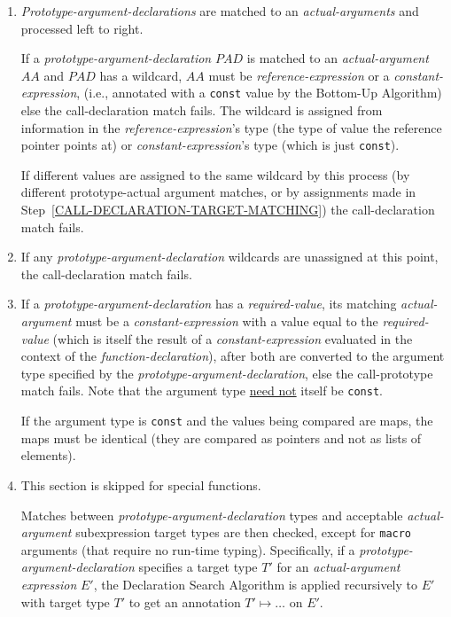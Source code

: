 \documentclass[12pt]{article}
\begin{document}
\begin{enumerate}
\item\label{CALL-DECLARATION-ARGUMENT-MATCHING}
{\em Prototype-argument-declarations} are matched to
an {\em actual-arguments} and processed left to right.

If a {\em prototype-argument-declaration} $PAD$ is matched
to an {\em actual-argument} $AA$ and $PAD$ has a wildcard,
$AA$ must be {\em reference-expression} or a {\em constant-expression},
(i.e., annotated with a {\tt const} value by the Bottom-Up Algorithm)
else the
call-declaration match fails.  The wildcard is assigned from
information in the {\em reference-expression}'s
type (the type of value the reference pointer points at) or
{\em constant-expression}'s type (which is just {\tt const}).

If different values are assigned to the same wildcard by this
process (by different prototype-actual argument matches, or by
assignments made in Step~\ref{CALL-DECLARATION-TARGET-MATCHING})
the call-declaration match fails.

\item\label{CALL-DECLARATION-UNASSIGNED-WILDCARDS}
If any {\em prototype-argument-declaration} wildcards are unassigned
at this point,
the call-declaration match fails.

\item\label{CALL-DECLARATION-REQUIRED-VALUES}
If a {\em prototype-argument-declaration} has a {\em required-value},
its matching {\em actual-argument} must be a {\em constant-expression} with
a value equal to the {\em required-value} (which is itself the result
of a {\em constant-expression} evaluated in the context of the
{\em function-declaration}), after both are converted
to the argument type specified by the {\em prototype-argument-declaration},
else the call-prototype
match fails.  Note that the argument type \underline{need not} itself
be {\tt const}.

If the argument type is {\tt const} and the values being compared are
maps, the maps must be identical (they are compared as pointers and
not as lists of elements).

\item\label{CALL-DECLARATION-ARGUMENT-TYPING}
This section is skipped for special functions.

Matches between {\em prototype-argument-declaration} types
and acceptable {\em actual-argu\-ment} subexpression target types
are then checked, except for {\tt macro} arguments (that require
no run-time typing).  Specifically, if a {\em prototype-argument-declaration}
specifies a target type $T'$ for an {\em actual-argument} {\em expression} $E'$,
the Declaration Search Algorithm
is applied recursively to $E'$ with target type $T'$ to get
an annotation $T'\mapsto\ldots$ on $E'$.


\end{enumerate}
\end{document}

